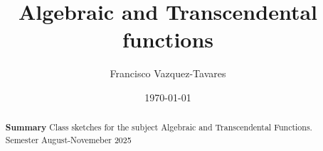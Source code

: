 \documentclass[a4paper]{tufte-handout} %
\title{ Algebraic and Transcendental functions }
\author{Francisco Vazquez-Tavares}
\date{\today} %
\begin{document}
\maketitle %


\begin{abstract}
	\textbf{Summary}
        Class sketches for the subject Algebraic and Transcendental Functions.
        Semester August-Novemeber 2025
\end{abstract}



%
%
%
%



\nocite{*}


\end{document}
